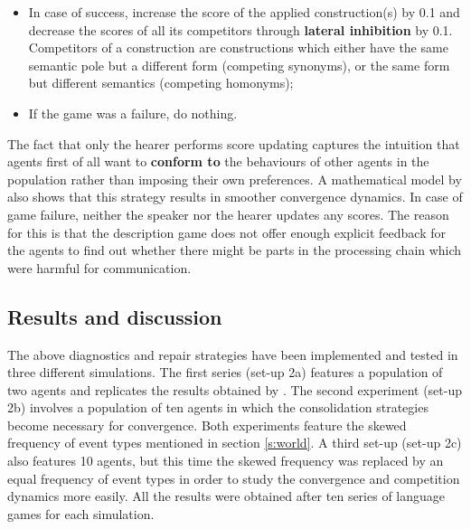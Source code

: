 \begin{itemize}
\item In case of success, increase the score of the applied construction(s) by 0.1 and decrease the scores of all its competitors through {\bfseries lateral inhibition} by 0.1. Competitors of a construction are constructions which either have the same semantic pole but a different form (competing synonyms), or the same form but different semantics (competing homonyms);
\item If the game was a failure, do nothing.
\end{itemize}

The fact that only the hearer performs score updating captures the intuition that agents first of all want to {\bfseries conform to} the behaviours of other agents in the population rather than imposing their own preferences. A mathematical model by \citet{devylder07evolution} also shows that this strategy results in smoother convergence dynamics. In case of game failure, neither the speaker nor the hearer updates any scores. The reason for this is that the description game does not offer enough explicit feedback for the agents to find out whether there might be parts in the processing chain which were harmful for communication.

\subsection{Results and discussion}

The above diagnostics and repair strategies have been implemented and tested in three different simulations. The first series (set-up 2a) features a population of two agents and replicates the results obtained by \citet{steels02simulating, steels04constructivist}. The second experiment (set-up 2b) involves a population of ten agents in which the consolidation strategies become necessary for convergence. Both experiments feature the skewed frequency of event types mentioned in section \ref{s:world}. A third set-up (set-up 2c) also features 10 agents, but this time the skewed frequency was replaced by an equal frequency of event types in order to study the convergence and competition dynamics more easily. All the results were obtained after ten series of language games for each simulation.


